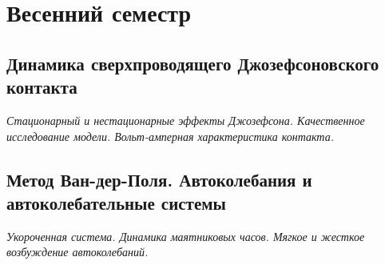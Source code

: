 \documentclass[14pt,a4paper]{extreport}
\theoremstyle{definition}
\begin{document}
\part{Весенний семестр}
\newpage
\chapter{Динамика сверхпроводящего Джозефсоновского контакта}
\epigraph{\textit{Стационарный и нестационарные эффекты Джозефсона.
Качественное исследование модели. Вольт-амперная
характеристика контакта.}}{}
\label{sec:lect11}
    

\newpage
\chapter{Метод Ван-дер-Поля. Автоколебания и автоколебательные системы}
\epigraph{\textit{Укороченная система. Динамика маятниковых часов. Мягкое и
жесткое возбуждение автоколебаний.}}{}
\label{sec:lect12}
    

% 	

% 	





% 



% 	

% 	
	
\end{document}
